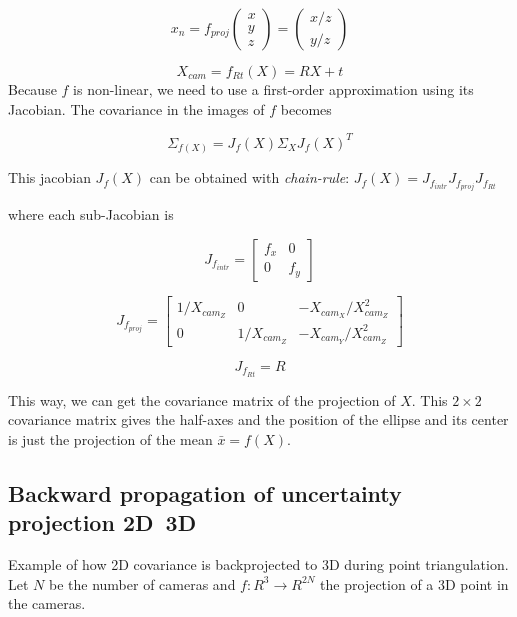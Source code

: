 \begin{equation}
    x_n = f_{proj}\left(\begin{array}{c}
        x \\ y \\ z \end{array}\right) = 
        \left(\begin{array}{c}
            x / z \\ y / z
        \end{array}\right)
\end{equation}

\begin{equation}
    X_{cam} = f_{Rt}(X) = R X + t
\end{equation}
Because $f$ is non-linear, we need to use a first-order approximation using its Jacobian. The covariance in the images of $f$ becomes

\begin{equation}
    \Sigma_{f(X)} = J_f(X) \Sigma_X J_f(X)^T
\end{equation}

This jacobian $J_f(X)$ can be obtained with \textit{chain-rule}: $J_f(X) = J_{f_{intr}} J_{f_{proj}} J_{f_{Rt}}$

where each sub-Jacobian is

\begin{equation}
   J_{f_{intr}} = \left[\begin{array}{cc}
       f_x & 0 \\
        0 & f_y
   \end{array}\right]
\end{equation}

\begin{equation}
   J_{f_{proj}} = \left[\begin{array}{ccc}
       1/X_{cam_Z} & 0 & - X_{cam_X}/X^2_{cam_Z} \\
       0 & 1/X_{cam_Z} & - X_{cam_Y}/X^2_{cam_Z}
   \end{array}\right]
\end{equation}

\begin{equation}
    J_{f_{Rt}} = R
\end{equation}


This way, we can get the covariance matrix of the projection of $X$. This $2\times2$ covariance matrix gives the half-axes and the position of the ellipse and its center is just the projection of the mean $\bar{x} = f(X)$.


\subsection{Backward propagation of uncertainty projection 2D~3D}
Example of how 2D covariance is backprojected to 3D during point triangulation.
Let $N$ be the number of cameras and $f: R^3 \rightarrow R^{2N}$ the projection of a 3D point in the cameras.

